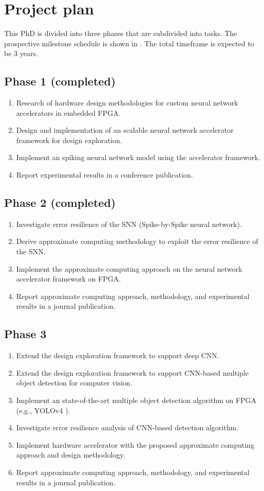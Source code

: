 \section{Project plan}
This PhD is divided into three phases that are subdivided into tasks. The prospective milestone schedule is shown in . The total timeframe is expected to be 3 years.

\subsection{Phase 1 (completed)}
\begin{enumerate}
\item Research of hardware design methodologies for custom neural network accelerators in embedded FPGA.
\item Design and implementation of an scalable neural network accelerator framework for design exploration.
\item Implement an spiking neural network model using the accelerator framework.
\item Report experimental results in a conference publication.
\end{enumerate}

\subsection{Phase 2 (completed)}
\begin{enumerate}
	\item Investigate error resilience of the SNN (Spike-by-Spike neural network).
	\item Derive approximate computing methodology to exploit the error resilience of the SNN.
	\item Implement the approximate computing approach on the neural network accelerator framework on FPGA.
	\item Report approximate computing approach, methodology, and experimental results in a journal publication.
\end{enumerate}

\subsection{Phase 3}
\begin{enumerate}
	\item Extend the design exploration framework to support deep CNN.
	\item Extend the design exploration framework to support CNN-based multiple object detection for computer vision.
	\item Implement an state-of-the-art multiple object detection algorithm on FPGA (e.g., YOLOv4 \cite{bochkovskiy2020yolov4}).
	\item Investigate error resilience analysis of CNN-based detection algorithm.
	\item Implement hardware accelerator with the proposed approximate computing approach and design methodology.
	\item Report approximate computing approach, methodology, and experimental results in a journal publication.
\end{enumerate}

